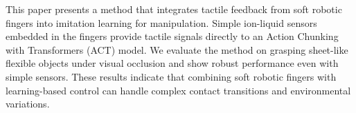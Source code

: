 This paper presents a method that integrates tactile feedback from soft robotic fingers into imitation learning for manipulation. Simple ion-liquid sensors embedded in the fingers provide tactile signals directly to an Action Chunking with Transformers (ACT) model. We evaluate the method on grasping sheet-like flexible objects under visual occlusion and show robust performance even with simple sensors. These results indicate that combining soft robotic fingers with learning-based control can handle complex contact transitions and environmental variations.
\small 
